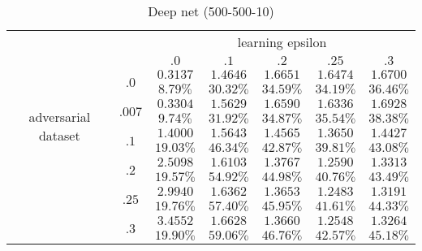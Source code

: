 		\begin{table}[h]
		\centering
		        \begin{tabular}{cc||ccccc}

		        	& &  \multicolumn{5}{c}{learning epsilon} \\
		        	& &  $.0$ & $.1$ & $.2$ & $.25$ & $.3$ \\
		            \hline \hline
		            \multirow{8}{*}{adversarial dataset} 
		            	& \multirow{2}{*}{$.0$}  &$0.3137 	$&$1.4646 	$&$1.6651 	$&$1.6474 	$&$1.6700 	$ \\ 
		            	&                        &$8.79\%	$&$30.32\%	$&$34.59\%	$&$34.19\%	$&$36.46\%	$ \\ \cline{2-7} 
		            	& \multirow{2}{*}{$.007$}&$0.3304 	$&$1.5629 	$&$1.6590 	$&$1.6336 	$&$1.6928 	$ \\ 
		            	&                        &$9.74\%	$&$31.92\%	$&$34.87\%	$&$35.54\%	$&$38.38\%	$ \\ \cline{2-7} 
		            	& \multirow{2}{*}{$.1$}  &$1.4000 	$&$1.5643 	$&$1.4565 	$&$1.3650 	$&$1.4427 	$ \\
		            	&                        &$19.03\%	$&$46.34\%	$&$42.87\%	$&$39.81\%	$&$43.08\%	$ \\ \cline{2-7}
		                & \multirow{2}{*}{$.2$}  &$2.5098 	$&$1.6103 	$&$1.3767 	$&$1.2590 	$&$1.3313 	$ \\
		                &                        &$19.57\%	$&$54.92\%	$&$44.98\%	$&$40.76\%	$&$43.49\%	$ \\ \cline{2-7}
		                & \multirow{2}{*}{$.25$} &$2.9940 	$&$1.6362 	$&$1.3653 	$&$1.2483 	$&$1.3191 	$ \\
		                &                        &$19.76\%	$&$57.40\%	$&$45.95\%	$&$41.61\%	$&$44.33\%	$ \\ \cline{2-7}
		                & \multirow{2}{*}{$.3$}  &$3.4552 	$&$1.6628 	$&$1.3660 	$&$1.2548 	$&$1.3264 	$ \\
		                &                        &$19.90\%	$&$59.06\%	$&$46.76\%	$&$42.57\%	$&$45.18\%	$ \\

		            
		        \end{tabular}
		    \caption{Deep net (500-500-10)}
		    \label{tab:xxx}
		\end{table}


